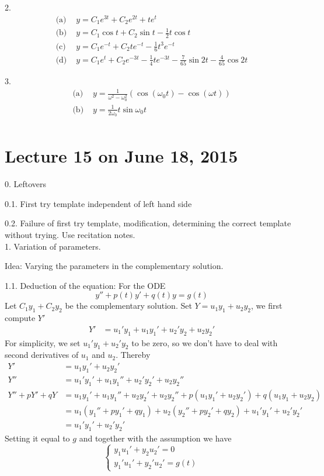 \documentclass[11pt]{article}
\begin{document}
2. 
$$\begin{aligned}
\text{(a)  }&  y = C_1 e^{3t}+ C_2 e^{2t}+ te^t\\
\text{(b)  }&  y = C_1 \cos t + C_2 \sin t - \frac 1 2 t\cos t \\
\text{(c)  }&  y = C_1 e^{-t} + C_2 te^{-t} - \frac 1 6 t^3 e^{-t}\\
\text{(d)  }&  y = C_1 e^{t} + C_2 e^{-3t} - \frac 1 4 te^{-3t} - \frac 7 {65} \sin 2t -\frac 4 {65}\cos 2t
\end{aligned}$$

3. 
$$
\begin{aligned}
\text{(a)  }&  y = \frac 1 {\omega^2-\omega_0^2} \left(\cos(\omega_0 t) -\cos(\omega t)\right)\\
\text{(b)  }&  y = \frac 1 {2\omega_0}t\sin \omega_0 t\\
\end{aligned}
$$

\newpage
\section{Lecture 15 on June 18, 2015}

0. Leftovers

0.1. First try template independent of left hand side

0.2. Failure of first try template,  modification, determining the correct template without trying. Use recitation notes.\\

1. Variation of parameters.

Idea: Varying the parameters in the complementary solution. 

1.1. Deduction of the equation: For the ODE
$$y'' + p(t)y' + q(t)y = g(t)$$
Let $C_1y_1 + C_2y_2$ be the complementary solution. Set $Y = u_1y_1 + u_2y_2$, we first compute $Y'$
$$\begin{aligned}
Y' &= u_1' y_1 + u_1y_1' + u_2' y_2 + u_2 y_2' 
\end{aligned}$$
For simplicity, we set $u_1'y_1+u_2'y_2$ to be zero, so we don't have to deal with second derivatives of $u_1$ and $u_2$. Thereby
$$\begin{aligned}
Y' &= u_1y_1' + u_2y_2' \\
Y''&= u_1'y_1' + u_1y_1'' + u_2'y_2' + u_2y_2'' \\
Y'' + pY' + q Y &= u_1y_1' + u_1y_1'' + u_2y_2' + u_2y_2'' + p(u_1y_1' + u_2y_2') + q(u_1y_1 + u_2y_2) \\
&= u_1(y_1'' + py_1' + qy_1) + u_2(y_2'' + py_2' + qy_2) + u_1'y_1' + u_2'y_2'\\
&= u_1'y_1' + u_2'y_2'
\end{aligned}$$
Setting it equal to $g$ and together with the assumption we have
$$\left\{\begin{aligned}
y_1u_1' + y_2u_2' = 0\\
y_1'u_1'+y_2'u_2' = g(t)
\end{aligned}\right.$$
\end{document}
